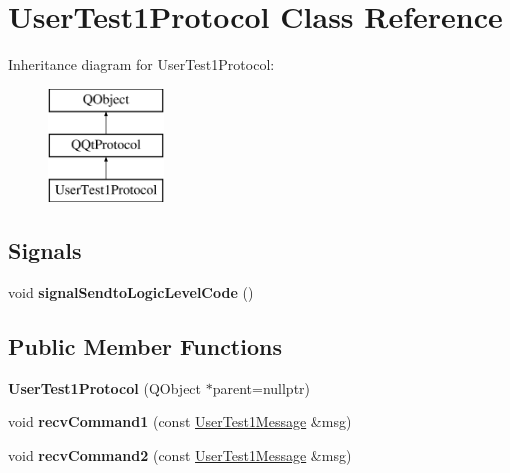 \hypertarget{class_user_test1_protocol}{}\section{User\+Test1\+Protocol Class Reference}
\label{class_user_test1_protocol}
Inheritance diagram for User\+Test1\+Protocol\+:\begin{figure}[H]
\begin{center}
\leavevmode
\includegraphics[height=3.000000cm]{class_user_test1_protocol}
\end{center}
\end{figure}
\subsection*{Signals}
\begin{DoxyCompactItemize}
\item 
\mbox{\label{class_user_test1_protocol_a6cb4670dea6e330961b58b32141a2033}} 
void {\bfseries signal\+Sendto\+Logic\+Level\+Code} ()
\end{DoxyCompactItemize}
\subsection*{Public Member Functions}
\begin{DoxyCompactItemize}
\item 
\mbox{\label{class_user_test1_protocol_a6df45425aab13342d3e93dde916b0eba}} 
{\bfseries User\+Test1\+Protocol} (Q\+Object $\ast$parent=nullptr)
\item 
\mbox{\label{class_user_test1_protocol_a9c002ac01e35a1a5b876672076f7b7f7}} 
void {\bfseries recv\+Command1} (const \mbox{\hyperlink{class_user_test1_message}{User\+Test1\+Message}} \&msg)
\item 
\mbox{\label{class_user_test1_protocol_ad274b454b1c06d2a5f71c04fc6567694}} 
void {\bfseries recv\+Command2} (const \mbox{\hyperlink{class_user_test1_message}{User\+Test1\+Message}} \&msg)
\end{DoxyCompactItemize}
